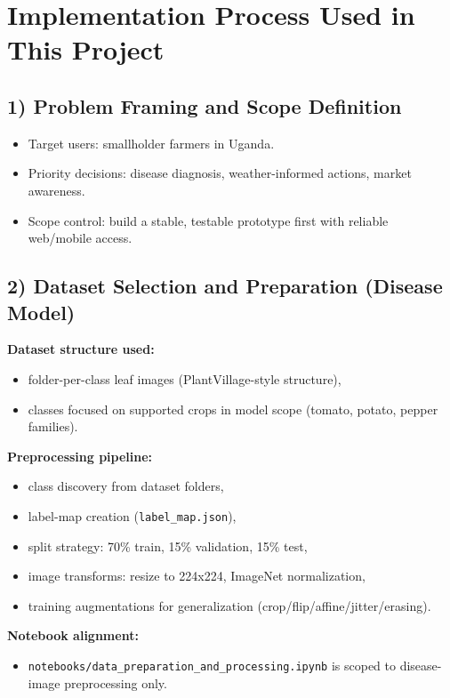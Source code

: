 \documentclass[11pt,a4paper]{article}
\begin{document}
\section{Implementation Process Used in This Project}
\subsection{1) Problem Framing and Scope Definition}
\begin{itemize}[noitemsep]
  \item Target users: smallholder farmers in Uganda.
  \item Priority decisions: disease diagnosis, weather-informed actions, market awareness.
  \item Scope control: build a stable, testable prototype first with reliable web/mobile access.
\end{itemize}

\subsection{2) Dataset Selection and Preparation (Disease Model)}
\textbf{Dataset structure used:}
\begin{itemize}[noitemsep]
  \item folder-per-class leaf images (PlantVillage-style structure),
  \item classes focused on supported crops in model scope (tomato, potato, pepper families).
\end{itemize}

\textbf{Preprocessing pipeline:}
\begin{itemize}[noitemsep]
  \item class discovery from dataset folders,
  \item label-map creation (\texttt{label\_map.json}),
  \item split strategy: 70\% train, 15\% validation, 15\% test,
  \item image transforms: resize to 224x224, ImageNet normalization,
  \item training augmentations for generalization (crop/flip/affine/jitter/erasing).
\end{itemize}

\textbf{Notebook alignment:}
\begin{itemize}[noitemsep]
  \item \texttt{notebooks/data\_preparation\_and\_processing.ipynb} is scoped to disease-image preprocessing only.
\end{itemize}
\end{document}
